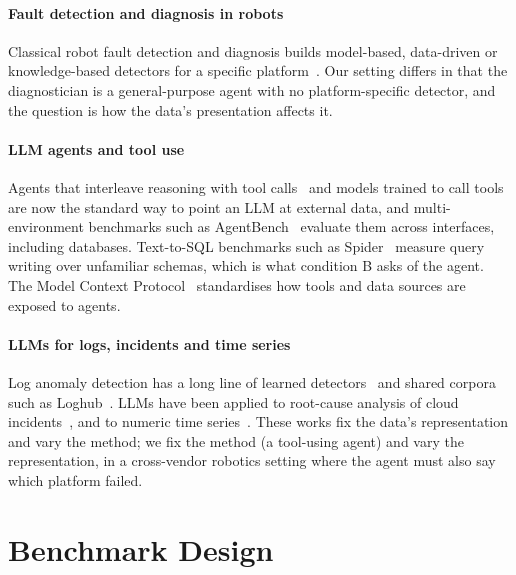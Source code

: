 \documentclass[conference]{IEEEtran}
\newcommand{\condB}{B}
\begin{document}
\paragraph{Fault detection and diagnosis in robots} Classical robot fault detection
and diagnosis builds model-based, data-driven or knowledge-based detectors for a
specific platform~\cite{khalastchi2018fdd}. Our setting differs in that the
diagnostician is a general-purpose agent with no platform-specific detector, and
the question is how the data's presentation affects it.

\paragraph{LLM agents and tool use} Agents that interleave reasoning with tool
calls~\cite{yao2023react} and models trained to call tools~\cite{schick2023toolformer}
are now the standard way to point an LLM at external data, and multi-environment
benchmarks such as AgentBench~\cite{liu2024agentbench} evaluate them across
interfaces, including databases. Text-to-SQL benchmarks such as
Spider~\cite{yu2018spider} measure query writing over unfamiliar schemas, which is
what condition \condB{} asks of the agent. The Model Context Protocol~\cite{mcp2024}
standardises how tools and data sources are exposed to agents.

\paragraph{LLMs for logs, incidents and time series} Log anomaly detection has a
long line of learned detectors~\cite{du2017deeplog} and shared corpora such as
Loghub~\cite{he2023loghub}. LLMs have been applied to root-cause analysis of
cloud incidents~\cite{ahmed2023recommending, chen2024rcacopilot}, and to numeric
time series~\cite{gruver2023llmtime}. These works fix the data's representation and
vary the method; we fix the method (a tool-using agent) and vary the representation,
in a cross-vendor robotics setting where the agent must also say which platform
failed.

\section{Benchmark Design}


\end{document}
